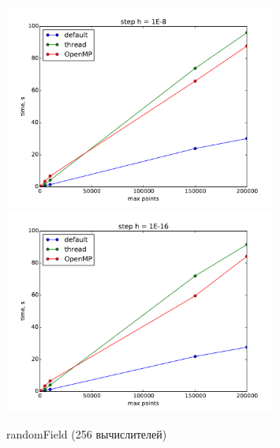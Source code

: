\documentclass[14pt,final,titlepage,pscyr]{hedwork}
\begin{document}
\begin{figure}[ht!]
    \center
    \includegraphics[width=0.8\textwidth]{randomField_cl_1E-8}
    \includegraphics[width=0.8\textwidth]{randomField_cl_1E-16}
    \caption{randomField (256 вычислителей)}
\end{figure}

\pagebreak
\end{document}

